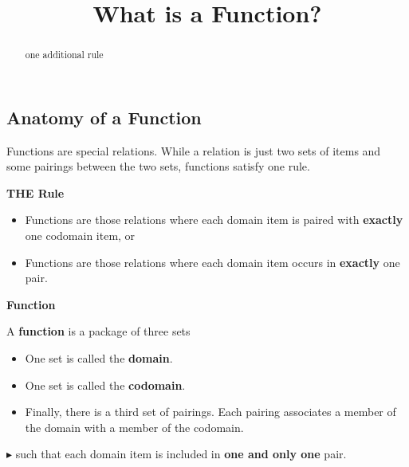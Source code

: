 \documentclass{ximera}
\title{What is a Function?}
\begin{document}
\begin{abstract}
one additional rule
\end{abstract}
\maketitle




\subsection*{Anatomy of a Function}

Functions are special relations. While a relation is just two sets of items and some pairings between the two sets, functions satisfy one rule. 


\begin{condition} \textbf{\textcolor{green!50!black}{THE Rule}} 

\begin{itemize}
\item Functions are those relations where each domain item is paired with \textbf{\textcolor{red!70!black}{exactly}} one codomain item, or
\item Functions are those relations where each domain item occurs in \textbf{\textcolor{red!70!black}{exactly}} one pair.
\end{itemize}
\end{condition}






\begin{definition} \textbf{\textcolor{green!50!black}{Function}}

A \textbf{function} is a package of three sets

\begin{itemize}
\item One set is called the \textbf{\textcolor{purple!85!blue}{domain}}. 
\item One set is called the \textbf{\textcolor{purple!85!blue}{codomain}}.  
\item Finally, there is a third set of pairings.  Each pairing associates a member of the domain with a member of the codomain. 
\end{itemize}

\textbf{\textcolor{red!70!darkgray}{$\blacktriangleright$}} such that each domain item is included in \textbf{\textcolor{red!70!black}{one and only one}} pair.

\end{definition}
\end{document}
